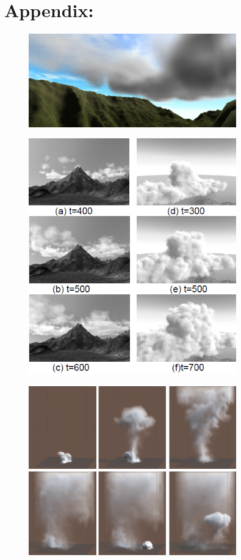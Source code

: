 {}
\addtocounter{section}{1}
\section*{Appendix:}
\begin{figure}[ht!]
	\label{fig:Simulation_of_Cloud_Dynamics_on_Graphics_Hardware_2}
	\centering
	\includegraphics[width=90mm]{images/Simulation_of_Cloud_Dynamics_on_Graphics_Hardware_2.PNG}
	\caption{\citet{HarrisEtAl03}}
\end{figure}
\begin{figure}[ht!]
	\label{fig:A_Method_for_Modeling_Clouds_based_on_Atmospheric_Fluid_Dynamics}
	\centering
	\includegraphics[width=90mm]{images/A_Method_for_Modeling_Clouds_based_on_Atmospheric_Fluid_Dynamics.PNG}
	\caption{\citet{Miyazaki01}}
\end{figure}
\begin{figure}[ht!]
	\label{fig:Visual_Simulation_of_Smoke}
	\centering
	\includegraphics[width=90mm]{images/Visual_Simulation_of_Smoke.PNG}
	\caption{\citet*{Fedkiw01}}
\end{figure}
